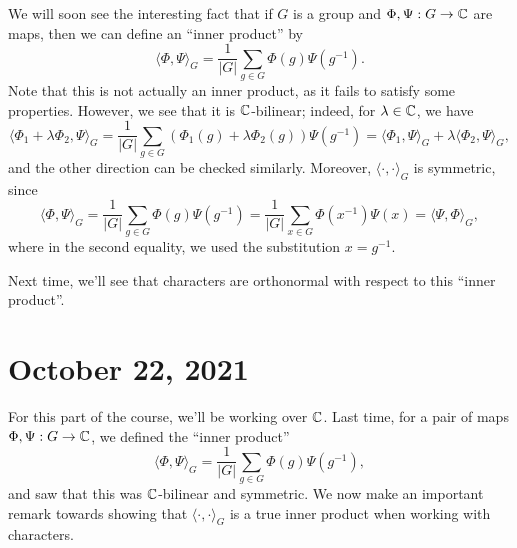 We will soon see the interesting fact that if $G$ is a group and 
$\Phi, \Psi : G \to \mathbb{C}$ are maps, then we can define an ``inner product'' by 
\[ \langle \Phi, \Psi \rangle_G = \frac{1}{|G|} \sum_{g \in G} \Phi(g) 
\Psi(g^{-1}). \] 
Note that this is not actually an inner product, as it fails to satisfy 
some properties. However, we see that it is $\mathbb{C}$-bilinear; indeed, for 
$\lambda \in \mathbb{C}$, we have 
\[ \langle \Phi_1 + \lambda\Phi_2, \Psi \rangle_G = 
\frac{1}{|G|} \sum_{g \in G} (\Phi_1(g) + \lambda\Phi_2(g)) \Psi(g^{-1}) 
= \langle \Phi_1, \Psi \rangle_G + \lambda \langle \Phi_2, \Psi \rangle_G, \] 
and the other direction can be checked similarly. Moreover, 
$\langle \cdot, \cdot \rangle_G$ is symmetric, since 
\[ \langle \Phi, \Psi \rangle_G = \frac1{|G|} \sum_{g\in G} 
\Phi(g) \Psi(g^{-1}) = \frac1{|G|} \sum_{x\in G} \Phi(x^{-1}) \Psi(x) 
= \langle \Psi, \Phi \rangle_G, \] 
where in the second equality, we used the substitution $x = g^{-1}$. 

Next time, we'll see that characters are orthonormal with respect to this 
``inner product''. 

\section{October 22, 2021}
For this part of the course, we'll be working over $\mathbb{C}$. Last time, 
for a pair of maps $\Phi, \Psi : G \to \mathbb{C}$, we defined the ``inner product''
\[ \langle \Phi, \Psi \rangle_G = \frac{1}{|G|} \sum_{g \in G} \Phi(g) 
\Psi(g^{-1}), \] 
and saw that this was $\mathbb{C}$-bilinear and symmetric. We now make an important 
remark towards showing that $\langle \cdot, \cdot \rangle_G$ is a 
true inner product when working with characters. 

